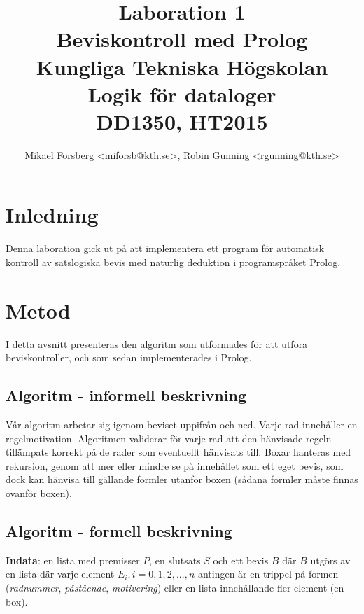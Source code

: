 \documentclass[a4paper,10.5pt]{article}
\begin{document}
\title{Laboration 1\\ Beviskontroll med Prolog\\ \vspace{0.2cm} \small Kungliga Tekniska Högskolan\\ Logik för dataloger\\ DD1350, HT2015}
\author{Mikael Forsberg <miforsb@kth.se>, Robin Gunning <rgunning@kth.se>}
\maketitle

\newpage
\tableofcontents

\newpage
{}
\section{Inledning}
Denna laboration gick ut på att implementera ett program för automatisk
kontroll av satslogiska bevis med naturlig deduktion i programspråket
Prolog.

\section{Metod}
I detta avsnitt presenteras den algoritm som utformades för att
utföra beviskontroller, och som sedan implementerades i Prolog.

\subsection{Algoritm - informell beskrivning}
Vår algoritm arbetar sig igenom beviset uppifrån och ned. Varje
rad innehåller en regelmotivation. Algoritmen validerar för varje
rad att den hänvisade regeln tillämpats korrekt på de rader som
eventuellt hänvisats till. Boxar hanteras med rekursion, genom att 
mer eller mindre se på innehållet som ett eget bevis, som dock kan
hänvisa till gällande formler utanför boxen (sådana formler måste
finnas ovanför boxen).

\subsection{Algoritm - formell beskrivning}
\textbf{Indata}: en lista med premisser $P$, en slutsats $S$ och ett
bevis $B$ där $B$ utgörs av en lista där varje element $E_i, i = 0,1,2,...,n$ antingen
är en trippel på formen (\emph{radnummer}, \emph{påstående},
\emph{motivering}) eller en lista innehållande fler element (en box).
\bigskip
\end{document}
